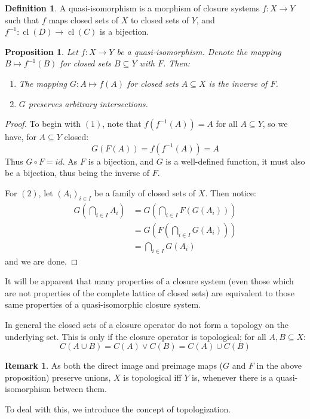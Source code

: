 \documentclass{article}
\theoremstyle{plain}
\newtheorem{proposition}[theorem]{Proposition}
\theoremstyle{definition}
\newtheorem{definition}{Definition}[section]
\newtheorem{remark}[theorem]{Remark}
\begin{document}
\begin{definition}
    A quasi-isomorphism is a morphism of closure systems $f \colon X \rightarrow Y$ such that $f$ maps closed sets of $X$ to closed sets of $Y$, and $f^{-1} \colon \operatorname{cl}(D) \rightarrow \operatorname{cl}(C)$ is a bijection.
\end{definition}

\begin{proposition} \label{prop:qiisnice}
    Let $f \colon X\rightarrow Y$ be a quasi-isomorphism.
    Denote the mapping $B \mapsto f^{-1}(B)$ for closed sets $B \subseteq Y$ with $F$.
    Then:
    \begin{enumerate}
        \item The mapping $G : A \mapsto f(A)$ for closed sets $A\subseteq X$ is the inverse of $F$.
        \item $G$ preserves arbitrary intersections.
    \end{enumerate}
\end{proposition}
\begin{proof}
    To begin with $(1)$, note that $f(f^{-1}(A)) = A$ for all $A\subseteq Y$, so we have, for $A \subseteq Y$ closed:
    $$G(F(A)) = f(f^{-1}(A)) = A$$
    Thus $G\circ F = id$.
    As $F$ is a bijection, and $G$ is a well-defined function, it must also be a bijection, thus being the inverse of $F$.\par
    For $(2)$, let $(A_i)_{i  \in I}$ be a family of closed sets of $X$.
    Then notice:
    \begin{align*}
        G(\bigcap_{i \in I} A_i) &= G(\bigcap_{i \in I} F(G(A_i)))\\
        &= G(F(\bigcap_{i \in I} G(A_i)))\\
        &= \bigcap_{i \in I} G(A_i)
    \end{align*}
    and we are done.
\end{proof}

It will be apparent that many properties of a closure system (even those which are not properties of the complete lattice of closed sets) are equivalent to those same properties of a quasi-isomorphic closure system.


In general the closed sets of a closure operator do not form a topology on the underlying set.
This is only if the closure operator is topological; for all $A, B \subseteq X$:
$$C(A\cup B) = C(A)\vee C(B) = C(A)\cup C(B)$$
\begin{remark}
    As both the direct image and preimage maps ($G$ and $F$ in the above proposition) preserve unions, $X$ is topological iff $Y$ is, whenever there is a quasi-isomorphism between them.
\end{remark}
To deal with this, we introduce the concept of topologization.
\end{document}
